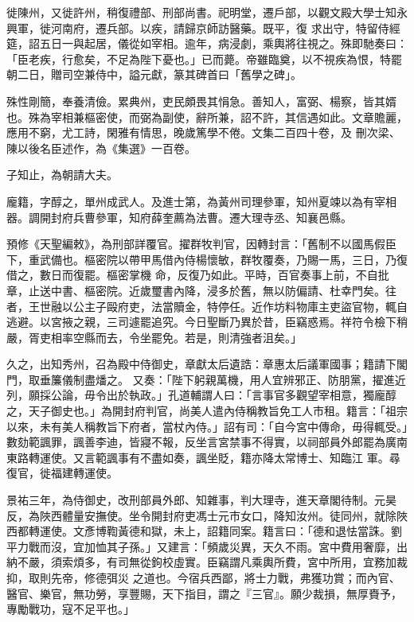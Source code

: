 \begin{pinyinscope}
 徙陳州，又徙許州，稍復禮部、刑部尚書。祀明堂，遷戶部，以觀文殿大學士知永興軍，徙河南府，遷兵部。以疾，請歸京師訪醫藥。既平，復
 求出守，特留侍經筵，詔五日一與起居，儀從如宰相。逾年，病浸劇，乘輿將往視之。殊即馳奏曰：「臣老疾，行愈矣，不足為陛下憂也。」已而薨。帝雖臨奠，以不視疾為恨，特罷朝二日，贈司空兼侍中，謚元獻，篆其碑首曰「舊學之碑」。



 殊性剛簡，奉養清儉。累典州，吏民頗畏其悁急。善知人，富弼、楊察，皆其婿也。殊為宰相兼樞密使，而弼為副使，辭所兼，詔不許，其信遇如此。文章贍麗，應用不窮，尤工詩，閑雅有情思，晚歲篤學不倦。文集二百四十卷，及
 刪次梁、陳以後名臣述作，為《集選》一百卷。



 子知止，為朝請大夫。



 龐籍，字醇之，單州成武人。及進士第，為黃州司理參軍，知州夏竦以為有宰相器。調開封府兵曹參軍，知府薛奎薦為法曹。遷大理寺丞、知襄邑縣。



 預修《天聖編敕》，為刑部詳覆官。擢群牧判官，因轉封言：「舊制不以國馬假臣下，重武備也。樞密院以帶甲馬借內侍楊懷敏，群牧覆奏，乃賜一馬，三日，乃復借之，數日而復罷。樞密掌機
 命，反復乃如此。平時，百官奏事上前，不自批章，止送中書、樞密院。近歲璽書內降，浸多於舊，無以防偏請、杜幸門矣。往者，王世融以公主子毆府吏，法當贖金，特停任。近作坊料物庫主吏盜官物，輒自逃避。以宮掖之親，三司遽罷追究。今日聖斷乃異於昔，臣竊惑焉。祥符令檢下稍嚴，胥吏相率空縣而去，令坐罷免。若是，則清強者沮矣。」



 久之，出知秀州，召為殿中侍御史，章獻太后遺誥：章惠太后議軍國事；籍請下閣門，取垂簾儀制盡燔之。
 又奏：「陛下躬親萬機，用人宜辨邪正、防朋黨，擢進近列，願採公論，毋令出於執政。」孔道輔謂人曰：「言事官多觀望宰相意，獨龐醇之，天子御史也。」為開封府判官，尚美人遣內侍稱教旨免工人市租。籍言：「祖宗以來，未有美人稱教旨下府者，當杖內侍。」詔有司：「自今宮中傳命，毋得輒受。」數劾範諷罪，諷善李迪，皆寢不報，反坐言宮禁事不得實，以祠部員外郎罷為廣南東路轉運使。又言範諷事有不盡如奏，諷坐貶，籍亦降太常博士、知臨江
 軍。尋復官，徙福建轉運使。



 景祐三年，為侍御史，改刑部員外郎、知雜事，判大理寺，進天章閣待制。元昊反，為陜西體量安撫使。坐令開封府吏馮士元市女口，降知汝州。徒同州，就除陜西都轉運使。文彥博鞫黃德和獄，未上，詔籍同案。籍言曰：「德和退怯當誅。劉平力戰而沒，宜加恤其子孫。」又建言：「頻歲災異，天久不雨。宮中費用奢靡，出納不嚴，須索煩多，有司無從鉤校虛實。臣竊謂凡乘輿所費，宮中所用，宜務加裁抑，取則先帝，修德弭災
 之道也。今宿兵西鄙，將士力戰，弗獲功賞；而內官、醫官、樂官，無功勞，享豐賜，天下指目，謂之『三官』。願少裁損，無厚賚予，專勵戰功，寇不足平也。」




\end{pinyinscope}
